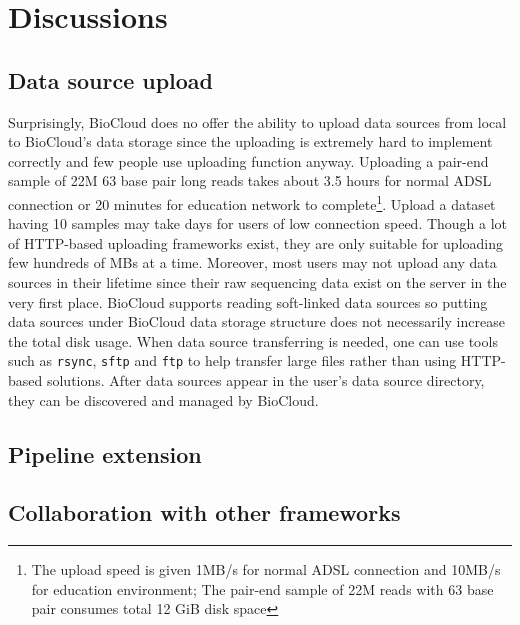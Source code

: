 \chapter{Discussions}
\label{c:discussion}


\section{Data source upload}

Surprisingly, BioCloud does no offer the ability to upload data sources from
local to BioCloud's data storage since the uploading is extremely hard to
implement correctly and few people use uploading function anyway. Uploading a
pair-end sample of 22M 63 base pair long reads takes about 3.5 hours for normal
ADSL connection or 20 minutes for education network to complete\footnote{The
upload speed is given 1MB/s for normal ADSL connection and 10MB/s for education
environment; The pair-end sample of 22M reads with 63 base pair consumes total
12 GiB disk space}. Upload a dataset having 10 samples may take days for users
of low connection speed. Though a lot of HTTP-based uploading frameworks exist,
they are only suitable for uploading few hundreds of MBs at a time. Moreover,
most users may not upload any data sources in their lifetime since their raw
sequencing data exist on the server in the very first place. BioCloud supports
reading soft-linked data sources so putting data sources under BioCloud data
storage structure does not necessarily increase the total disk usage. When data
source transferring is needed, one can use tools such as \texttt{rsync},
\texttt{sftp} and \texttt{ftp} to help transfer large files rather than using
HTTP-based solutions. After data sources appear in the user's data source
directory, they can be discovered and managed by BioCloud.



\section{Pipeline extension}
\label{s:pipeline-extension}

%
%


\section{Collaboration with other frameworks}

